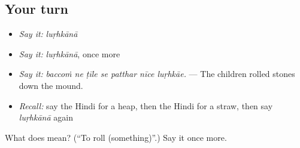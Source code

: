 \subsection*{Your turn}
\begin{itemize}
\raggedright
  \item \emph{Say it:} \emph{luṛhkānā}
  \item \emph{Say it:} \emph{luṛhkānā}, once more
  \item \emph{Say it:} \emph{baccoṁ ne ṭīle se patthar nīce luṛhkāe.} — The children rolled stones down the mound.
  \item \emph{Recall:} say the Hindi for a heap, then the Hindi for a straw, then say \emph{luṛhkānā} again
\end{itemize}

\begin{tcolorbox}[breakable,colback=teal!4,colframe=teal!35!black,title={Before you move on}]
What does  mean? (\textquotedblleft{}To roll (something)\textquotedblright{}.) Say it once more.
\end{tcolorbox}
